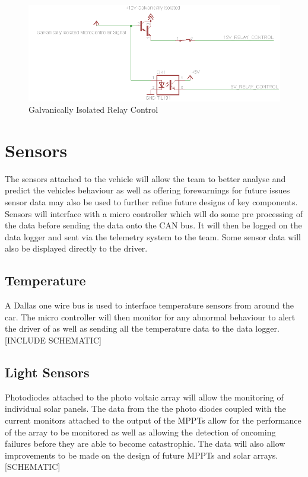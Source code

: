 \documentclass[10pt,a4paper]{article}
\begin{document}
\begin{figure}[H]
\includegraphics[width=\columnwidth]{SafeStateIsolated.png}%
\caption{Galvanically Isolated Relay Control}
\label{Fig:IsolatedControl}
\end{figure}


\section{Sensors}
The sensors attached to the vehicle will allow the team to better analyse and predict the vehicles behaviour as well as offering forewarnings for future issues sensor data may also be used to further refine future designs of key components. Sensors will interface with a micro controller which will do some pre processing of the data before sending the data onto the CAN bus. It will then be logged on the data logger and sent via the telemetry system to the team. Some sensor data will also be displayed directly to the driver. 

\subsection{Temperature}
A Dallas one wire bus is used to interface temperature sensors from around the car. The micro controller will then monitor for any abnormal behaviour to alert the driver of as well as sending all the temperature data to the data logger. [INCLUDE SCHEMATIC]

\subsection{Light Sensors}
Photodiodes attached to the photo voltaic array will allow the monitoring of individual solar panels. The data from the the photo diodes coupled with the current monitors attached to the output of the MPPTs allow for the performance of the array to be monitored as well as allowing the detection of oncoming failures before they are able to become catastrophic. The data will also allow improvements to be made on the design of future MPPTs and solar arrays. [SCHEMATIC] 
\end{document}
